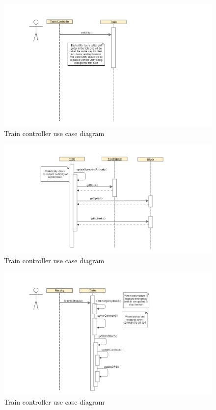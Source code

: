 \documentclass[]{article}
\begin{document}
\begin{figure}[H]
	\centering
	\includegraphics[scale=.2]{train_model_sqd_modify_utlilties.png}
	\caption{Train controller use case diagram}
\end{figure}

\begin{figure}[H]
	\centering
	\includegraphics[scale=.2]{train_model_sqd_set_speed_authority.png}
	\caption{Train controller use case diagram}
\end{figure}

\begin{figure}[H]
	\centering
	\includegraphics[scale=.2]{train_model_sqd_toggle_brake_failure.png}
	\caption{Train controller use case diagram}
\end{figure}
\end{document}
